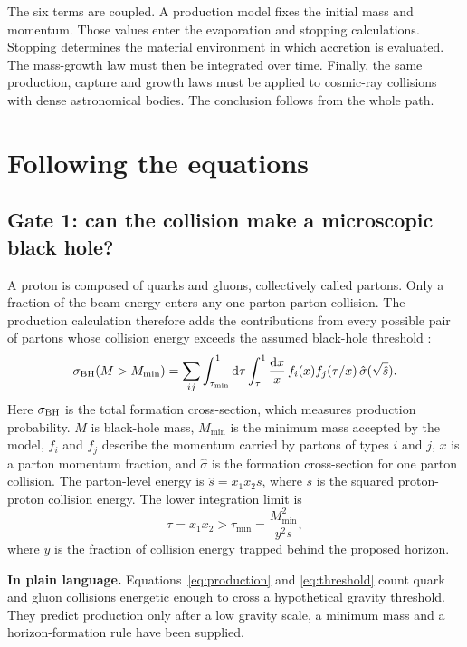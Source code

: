 \documentclass[11pt]{article}
\newcommand{\ud}{\mathrm{d}}
\newcommand{\plainmeaning}[1]{%
  \par\smallskip\noindent\begingroup\setlength{\fboxsep}{8pt}%
  \colorbox{plainbg}{\parbox{\dimexpr\linewidth-2\fboxsep\relax}{\textbf{In plain language.} #1}}%
  \endgroup\par\smallskip}
\begin{document}
The six terms are coupled. A production model fixes the initial mass and momentum. Those values enter the evaporation and stopping calculations. Stopping determines the material environment in which accretion is evaluated. The mass-growth law must then be integrated over time. Finally, the same production, capture and growth laws must be applied to cosmic-ray collisions with dense astronomical bodies. The conclusion follows from the whole path.

\section{Following the equations}

\subsection{Gate 1: can the collision make a microscopic black hole?}

A proton is composed of quarks and gluons, collectively called partons. Only a fraction of the beam energy enters any one parton-parton collision. The production calculation therefore adds the contributions from every possible pair of partons whose collision energy exceeds the assumed black-hole threshold \cite{GiddingsMangano2008}:
\begin{equation}
\sigma_{\rm BH}(M>M_{\min})=
\sum_{ij}\int_{\tau_{\min}}^1 \ud\tau
\int_\tau^1\frac{\ud x}{x}\,f_i(x)f_j(\tau/x)\,
\hat\sigma(\sqrt{\hat s}).
\label{eq:production}
\end{equation}
Here $\sigma_{\rm BH}$ is the total formation cross-section, which measures production probability. $M$ is black-hole mass, $M_{\min}$ is the minimum mass accepted by the model, $f_i$ and $f_j$ describe the momentum carried by partons of types $i$ and $j$, $x$ is a parton momentum fraction, and $\hat\sigma$ is the formation cross-section for one parton collision. The parton-level energy is $\hat s=x_1x_2s$, where $s$ is the squared proton-proton collision energy. The lower integration limit is
\begin{equation}
\tau=x_1x_2>\tau_{\min}=\frac{M_{\min}^2}{y^2s},
\label{eq:threshold}
\end{equation}
where $y$ is the fraction of collision energy trapped behind the proposed horizon.

\plainmeaning{Equations~\eqref{eq:production} and \eqref{eq:threshold} count quark and gluon collisions energetic enough to cross a hypothetical gravity threshold. They predict production only after a low gravity scale, a minimum mass and a horizon-formation rule have been supplied.}
\end{document}
